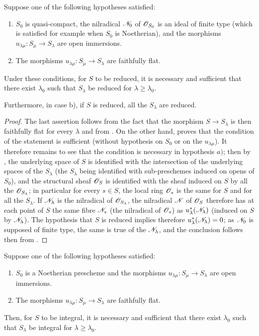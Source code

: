 \begin{proposition}[8.7.2]
\label{IV.8.7.2}
Suppose one of the following hypotheses satisfied:
\begin{enumerate}[label=\emph{\alph*)}]
\item $S_0$ is quasi-compact, the nilradical $\mathscr{N}_0$ of $\mathscr{O}_{S_0}$ is an ideal of finite type (which is satisfied for example when $S_0$ is Noetherian), and the morphisms $u_{\lambda\mu}:S_\mu\to S_\lambda$ are open immersions.
\item The morphisms $u_{\lambda\mu}:S_\mu\to S_\lambda$ are faithfully flat.
\end{enumerate}
Under these conditions, for $S$ to be reduced, it is necessary and sufficient that there exist $\lambda_0$ such that $S_\lambda$ be reduced for $\lambda\geqslant\lambda_0$.

Furthermore, in case b), if $S$ is reduced, all the $S_\lambda$ are reduced.
\end{proposition}

\begin{proof}
The last assertion follows from the fact that the morphism $S\to S_\lambda$ is then faithfully flat for every $\lambda$  and from .
On the other hand,  proves that the condition of the statement is sufficient (without hypothesis on $S_0$ or on the $u_{\lambda\mu}$).
It therefore remains to see that the condition is necessary in hypothesis $a)$; then by , the underlying space of $S$ is identified with the intersection of the underlying spaces of the $S_\lambda$ (the $S_\lambda$ being identified with sub-preschemes induced on opens of $S_0$), and the structural sheaf $\mathscr{O}_S$ is identified with
the sheaf induced on $S$ by all the $\mathscr{O}_{S_\lambda}$; in particular for every $s\in S$, the local ring $\mathscr{O}_s$ is the same for $S$ and for all the $S_\lambda$.
If $\mathscr{N}_\lambda$ is the nilradical of $\mathscr{O}_{S_\lambda}$, the nilradical $\mathscr{N}$ of $\mathscr{O}_S$ therefore has at each point of $S$ the same fibre $\mathscr{N}_s$ (the nilradical of $\mathscr{O}_s$) as $u_\lambda^*(\mathscr{N}_\lambda)$ (induced on $S$ by $\mathscr{N}_\lambda$).
The hypothesis that $S$ is reduced implies therefore $u_\lambda^*(\mathscr{N}_\lambda)=0$; as $\mathscr{N}_0$ is supposed of finite type, the same is true of the $\mathscr{N}_\lambda$, and the conclusion follows then from .
\end{proof}

\begin{corollary}[8.7.3]
\label{IV.8.7.3}
Suppose one of the following hypotheses satisfied:
\begin{enumerate}[label=\emph{\alph*)}]
\item $S_0$ is a Noetherian prescheme and the morphisms $u_{\lambda\mu}:S_\mu\to S_\lambda$ are open immersions.
\item The morphisms $u_{\lambda\mu}:S_\mu\to S_\lambda$ are faithfully flat.
\end{enumerate}
Then, for $S$ to be integral, it is necessary and sufficient that there exist $\lambda_0$ such that $S_\lambda$ be integral for $\lambda\geqslant\lambda_0$.
\end{corollary}


